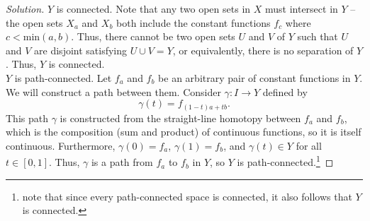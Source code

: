 \documentclass[11pt]{article}
\newenvironment{solution}
  {\renewcommand\qedsymbol{$\blacksquare$}\begin{proof}[Solution]}
  {\end{proof}}
\begin{document}
\begin{enumerate}[a)]
\begin{solution}
    $Y$ is connected. Note that any two open sets in $X$ must intersect in $Y$ -- the open sets $X_a$ and $X_b$ both include the constant functions $f_{c}$ where $c < \mathrm{min}(a, b)$. Thus, there cannot be two open sets $U$ and $V$ of $Y$ such that
    $U$ and $V$ are disjoint satisfying $U \cup V = Y$, or equivalently, there is no separation of $Y$. Thus, $Y$ is connected. \\

    $Y$ is path-connected. Let $f_a$ and $f_b$ be an arbitrary pair of constant functions in $Y$. We will construct a path between them. Consider $\gamma \colon I \rightarrow Y$ defined by
    \[
        \gamma(t) = f_{(1-t)a + tb}.
    \]
    This path $\gamma$ is constructed from the straight-line homotopy between $f_a$ and $f_b$, which is the composition (sum and product) of continuous functions, so it is itself continuous. 
    Furthermore, $\gamma(0) = f_a$, $\gamma(1) = f_b$, and $\gamma(t) \in Y$ for all $t \in [0, 1]$.  Thus, $\gamma$ is a path from $f_a$ to $f_b$ in $Y$, so $Y$ is path-connected.\footnote{note that since every path-connected space is connected, it also follows that $Y$ is connected.}
    \end{solution}
\end{enumerate}
\end{document}
